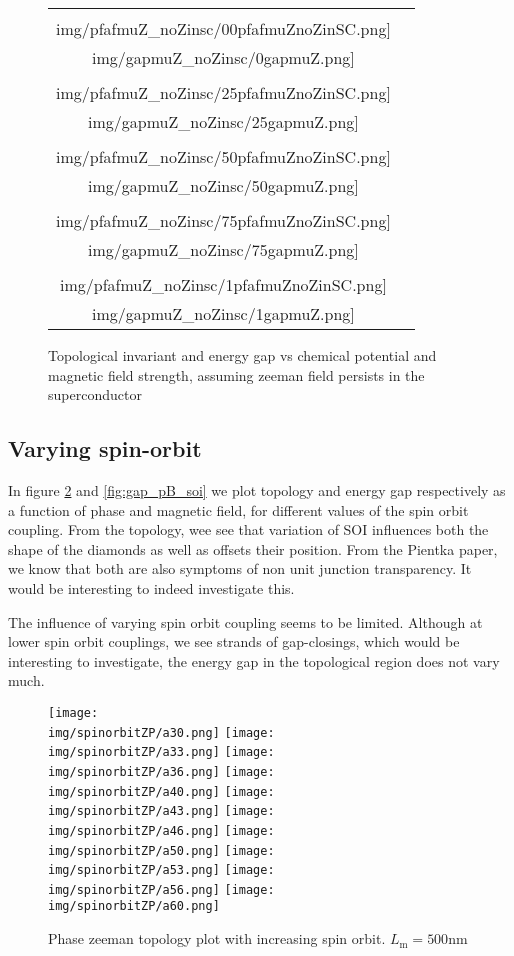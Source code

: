 \documentclass[10pt,a4paper]{article}
\newcommand{\img}{./images}
\begin{document}
\begin{figure}[H]
	\begin{tabular}{cc}
				\texttt{[image: \\img/pfafmuZ\_noZinsc/00pfafmuZnoZinSC.png]}&
			\texttt{[image: \\img/gapmuZ\_noZinsc/0gapmuZ.png]}\\
				\texttt{[image: \\img/pfafmuZ\_noZinsc/25pfafmuZnoZinSC.png]}&
			\texttt{[image: \\img/gapmuZ\_noZinsc/25gapmuZ.png]}\\
				\texttt{[image: \\img/pfafmuZ\_noZinsc/50pfafmuZnoZinSC.png]}&
			\texttt{[image: \\img/gapmuZ\_noZinsc/50gapmuZ.png]}\\
				\texttt{[image: \\img/pfafmuZ\_noZinsc/75pfafmuZnoZinSC.png]}&
			\texttt{[image: \\img/gapmuZ\_noZinsc/75gapmuZ.png]}\\
				\texttt{[image: \\img/pfafmuZ\_noZinsc/1pfafmuZnoZinSC.png]}&
			\texttt{[image: \\img/gapmuZ\_noZinsc/1gapmuZ.png]}\\
	\end{tabular}\label{fig:muZnosc}
		\caption{Topological invariant and energy gap vs chemical potential and magnetic field strength, assuming zeeman field persists in the superconductor}
\end{figure}

\newpage
	\subsection{Varying spin-orbit}
	In figure \ref{fig:pfaf_pB_soi} and \ref{fig:gap_pB_soi} we plot topology and energy gap respectively as a function of phase and magnetic field, for different values of the spin orbit coupling. From the topology, wee see that variation of SOI influences both the shape of the diamonds as well as offsets their position. From the Pientka paper, we know that both are also symptoms of non unit junction transparency. It would be interesting to indeed investigate this.
	
	The influence of varying spin orbit coupling seems to be limited. Although at lower spin orbit couplings, we see strands of gap-closings, which would be interesting to investigate, the energy gap in the topological region does not vary much.
		\begin{figure}[H]
			\texttt{[image: \\img/spinorbitZP/a30.png]}
			\texttt{[image: \\img/spinorbitZP/a33.png]}
			\texttt{[image: \\img/spinorbitZP/a36.png]}
			\texttt{[image: \\img/spinorbitZP/a40.png]}
			\texttt{[image: \\img/spinorbitZP/a43.png]}
			\texttt{[image: \\img/spinorbitZP/a46.png]}
			\texttt{[image: \\img/spinorbitZP/a50.png]}
			\texttt{[image: \\img/spinorbitZP/a53.png]}
			\texttt{[image: \\img/spinorbitZP/a56.png]}
			\texttt{[image: \\img/spinorbitZP/a60.png]}
			\caption{Phase zeeman topology plot with increasing spin orbit. $L_\text{m}=500$nm}
			\label{fig:pfaf_pB_soi}
		\end{figure}
	
\end{document}
